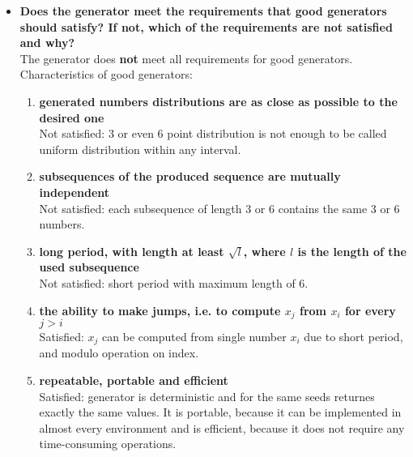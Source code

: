 \documentclass[a4paper,10pt]{article}
\begin{document}
\begin{itemize}
 \item \textbf{Does the generator meet the requirements that good generators should satisfy? If not, which of the requirements are not satisfied and why?} \\
  The generator does \textbf{not} meet all requirements for good generators. \\
  Characteristics of good generators:
   \begin{enumerate}
    \item \textbf{generated numbers distributions are as close as possible to the desired one} \\
    Not satisfied: 3 or even 6 point distribution is not enough to be called uniform distribution within any interval.
    \item \textbf{subsequences of the produced sequence are mutually independent} \\
    Not satisfied: each subsequence of length 3 or 6 contains the same 3 or 6 numbers.
    \item \textbf{long period, with length at least $\sqrt{l}$, where $l$ is the length of the used subsequence} \\
    Not satisfied: short period with maximum length of 6.
    \item \textbf{the ability to make jumps, i.e. to compute $x_j$ from $x_i$ for every $j > i$} \\
    Satisfied: $x_j$ can be computed from single number $x_i$ due to short period, and modulo operation on index.
    \item \textbf{repeatable, portable and efficient} \\
    Satisfied: generator is deterministic and for the same seeds returnes exactly the same values. It is portable, because it can be implemented in almost every environment and is efficient, because it does not require any time-consuming operations.
   \end{enumerate}
 

\end{itemize}
\end{document}
